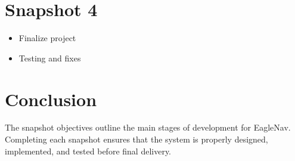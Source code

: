 \documentclass{article}
\begin{document}
\section{Snapshot 4}
\begin{itemize}
\item Finalize project
\item Testing and fixes
\end{itemize}

\section{Conclusion}
The snapshot objectives outline the main stages of development for EagleNav. Completing each snapshot ensures that the system is properly designed, implemented, and tested before final delivery.
\end{document}
